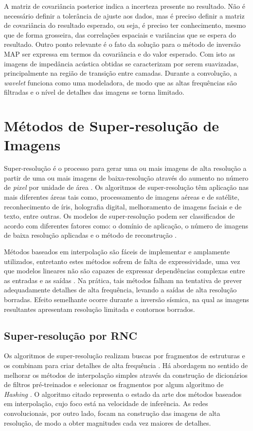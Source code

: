 A matriz de covariância posterior indica a incerteza
presente no resultado. Não é necessário
definir a tolerância de ajuste aos dados, mas é preciso definir a
matriz de covariância do resultado esperado, ou seja, é
preciso ter conhecimento, mesmo que de forma grosseira, das correlações espaciais e
variâncias que se espera do resultado. Outro ponto relevante é o fato da
solução para o método de inversão MAP ser expressa em termos da covariância
e do valor esperado. Com isto as imagens de impedância acústica obtidas
se caracterizam por serem suavizadas, principalmente na região de
transição entre camadas. Durante a convolução, a \textit{wavelet} funciona
como uma modeladora, de modo que as altas frequências são filtradas
e o nível de detalhes das imagens se torna limitado. 

\section{Métodos de Super-resolução de Imagens}
Super-resolução é o processo para gerar uma ou mais imagens de alta
resolução a partir de uma ou mais imagens de baixa-resolução
através do aumento no número de \textit{pixel} por unidade de área \cite{Nasrollahi2014}.
Os algoritmos de super-resolução têm aplicação nas mais diferentes áreas
tais como, processamento de imagens aéreas e de satélite, reconhecimento de
íris, holografia digital, melhoramento de imagens faciais e de texto, entre
outras. Os modelos de super-resolução podem ser classificados
de acordo com diferentes fatores como: o domínio de aplicação,
o número de imagens de baixa resolução aplicadas e o método de reconstrução \citep{Nasrollahi2014}.

Métodos baseados em interpolação são fáceis de implementar e amplamente utilizados,
entretanto estes métodos sofrem de falta de expressividade, uma vez que modelos lineares
não são capazes de expressar dependências complexas entre as entradas e as saídas \citep{HsiehAndrews1978}.
Na prática, tais métodos falham na tentativa de prever adequadamente detalhes de alta frequência,
levando a saídas de alta resolução borradas. Efeito semelhante ocorre durante a inversão sísmica,
na qual as imagens resultantes apresentam resolução limitada e contornos borrados.

\subsection{Super-resolução por RNC}

Os algoritmos de super-resolução realizam buscas por
fragmentos de estruturas e os combinam para criar detalhes
de alta frequência \citep{Freeman2002,Huang2015}. Há abordagem no sentido
de melhorar os métodos de interpolação simples através da construção
de dicionários de filtros pré-treinados e selecionar os fragmentos
por algum algoritmo de \textit{Hashing} \citep{Romano2017}. O algoritmo citado
representa o estado da arte dos métodos baseados em interpolação, cujo foco está na
velocidade de inferência. As redes convolucionais, por outro lado,
focam na construção das imagens de alta resolução, de modo a obter magnitudes
cada vez maiores de detalhes.

